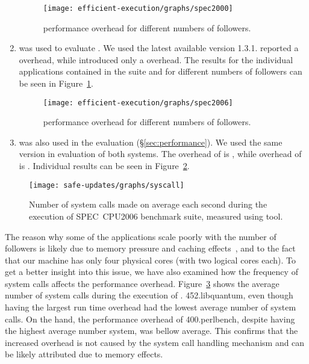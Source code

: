 \begin{enumerate}
\begin{figure}[!t]
  \centering
  \texttt{[image: efficient-execution/graphs/spec2000]}
  \caption{\speczerozero performance overhead for different numbers of followers.}
  \label{fig:spec2000}
\end{figure}

\item[\speczerozero\footnote{\url{http://www.spec.org/cpu2000/}}]
was used to evaluate \orchestra.  We used the latest available version 1.3.1.
\orchestra reported a \orchestraSpec overhead, while \varan introduced only a
\speczerozeroOneFollower overhead. The results for the individual applications
contained in the \speczerozero suite and for different numbers of followers can
be seen in Figure~\ref{fig:spec2000}.

\begin{figure}[!t]
  \centering
  \texttt{[image: efficient-execution/graphs/spec2006]}
  \caption{\speczerosix performance overhead for different numbers of followers.}
  \label{fig:spec2006}
\end{figure}

\item[\speczerosix\footnote{\url{http://www.spec.org/cpu2006/}}]
  was also used in the \mx evaluation (\S\ref{sec:performance}). We used the
  same version in evaluation of both systems.  The overhead of \mx is \mxSpec,
  while overhead of \varan is \speczerosixOneFollower.  Individual results can
  be seen in Figure~\ref{fig:spec2006}.

\end{enumerate}

\begin{figure}[ht]
\begin{center}
\texttt{[image: safe-updates/graphs/syscall]}
\caption{Number of system calls made on average each second during the
execution of SPEC~CPU2006 benchmark suite, measured using 
tool.}
\label{fig:syscall}
\end{center}
\end{figure}

The reason why some of the \speccpu applications scale poorly with the number
of followers is likely due to memory pressure and caching
effects~\cite{jaleel07}, and to the fact that our machine has only four
physical cores (with two logical cores each). To get a better insight into this
issue, we have also examined how the frequency of system calls affects the
performance overhead. Figure~\ref{fig:syscall} shows the average number of
system calls during the execution of \speczerosix. \textsf{452.libquantum},
even though having the largest run time overhead had the lowest average number
of system calls. On the hand, the performance overhead of
\textsf{400.perlbench}, despite having the highest average number system, was
bellow average. This confirms that the increased overhead is not caused by the
system call handling mechanism and can be likely attributed due to memory
effects.

